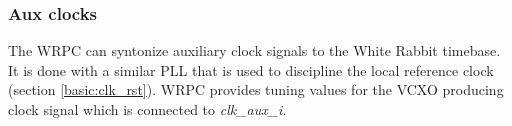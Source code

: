 \subsubsection{Aux clocks}

The WRPC can syntonize auxiliary clock signals to the White Rabbit timebase. It
is done with a similar PLL that is used to discipline the local reference clock
(section \ref{basic:clk_rst}). WRPC provides tuning values for the VCXO producing
clock signal which is connected to \emph{clk\_aux\_i}.
